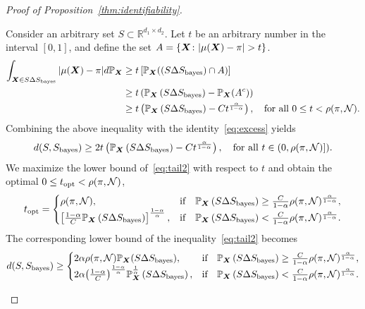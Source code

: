 \documentclass[11pt]{article}
\theoremstyle{plain}
\theoremstyle{definition}
\def\bayesS{S_{\textup{bayes}}}
\begin{document}
\begin{proof}[Proof of Proposition~\ref{thm:identifiability}]
\begin{enumerate}[label={2.\arabic*},wide, labelwidth=!, labelindent=0pt]
Consider an arbitrary set $S\subset\mathbb{R}^{d_1\times d_2}$. Let $t$ be an arbitrary number in the interval $[0,1]$, and define the set $A=\{\mX\colon |\mu(\mX)-\pi|>t\}$. 
\begin{align}
\int_{\bm X\in S\Delta S_{\text{bayes}}}|\mu(\bm X)-\pi|d \mathbb{P}_{\bm X} &\geq t \left[\mathbb{P}_{\bm X}(\left(S\Delta S_{\text{bayes}}) \cap A\right)\right] \\
&\geq t\left( \mathbb{P}_{\bm X}\left(S\Delta S_{\text{bayes}}\right) - \mathbb{P}_{\bm X}(A^c)\right)\\
&\geq t\left( \mathbb{P}_{\bm X}\left(S\Delta S_{\text{bayes}}\right) - Ct^{\alpha\over 1-\alpha}\right),\quad \text{for all }0\leq t < \rho(\pi,\mathcal{N}).
\end{align}
Combining the above inequality with the identity~\eqref{eq:excess} yields
\begin{equation}\label{eq:tail2}
d(S,\bayesS)\geq 2t\left( \mathbb{P}_{\mX}\left(S\Delta S_{\text{bayes}}\right) - Ct^{\alpha\over 1-\alpha}\right),\quad \text{for all }t\in(0,\rho(\pi,\tN)]).
\end{equation}
We maximize the lower bound of~\eqref{eq:tail2} with respect to $t$ and obtain the optimal $0\leq t_{\text{opt}}<\rho(\pi,\mathcal{N})$,
\[
t_{\text{opt}}=\begin{cases}
\rho(\pi,\mathcal{N}), & \text{if}\quad \mathbb{P}_{\bm X}\left(S\Delta S_{\text{bayes}}\right)\geq {C\over 1-\alpha}\rho(\pi,\mathcal{N})^{{\alpha\over1-\alpha}} ,\\
\left[{1-\alpha \over C}\mathbb{P}_{\bm X}\left(S\Delta S_{\text{bayes}}\right)\right]^{1-\alpha \over \alpha}, & \text{if}\quad \mathbb{P}_{\bm X}\left(S\Delta S_{\text{bayes}}\right)< {C\over 1-\alpha} \rho(\pi,\mathcal{N})^{{\alpha\over1-\alpha}}.
\end{cases}
\]
The corresponding lower bound of the inequality~\eqref{eq:tail2} becomes
\begin{align}
  d(S,\bayesS)\geq\begin{cases}
2\alpha\rho(\pi,\tN)\mathbb{P}_{\mX}(S\Delta \bayesS), & \text{if}\quad \mathbb{P}_{\mX}\left(S\Delta S_{\text{bayes}}\right)\geq {C\over 1-\alpha}\rho(\pi,\tN)^{{\alpha\over1-\alpha}} ,\\
2\alpha{\left(1-\alpha\over C\right)}^{1-\alpha \over \alpha} \mathbb{P}^{1\over \alpha}_{\mX}\left(S\Delta S_{\text{bayes}}\right), & \text{if}\quad \mathbb{P}_{\mX}\left(S\Delta S_{\text{bayes}}\right)< {C\over 1-\alpha} \rho(\pi,\tN)^{{\alpha\over1-\alpha}}.
\end{cases}
\end{align}


\end{enumerate}
\end{proof}
\end{document}
